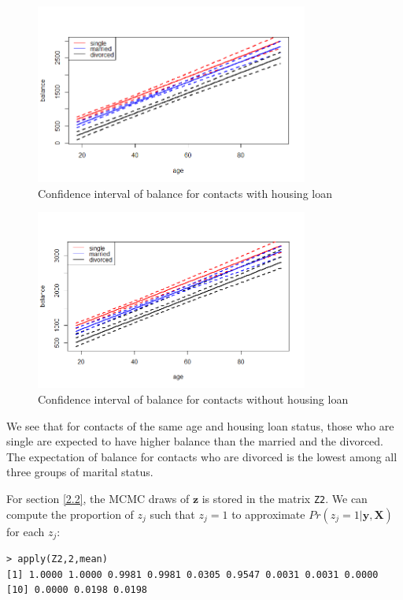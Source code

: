 \documentclass[a4page]{article}
\begin{document}
    \begin{figure}[H]
        \centering
        \includegraphics[width=0.8\textwidth]{intervals_h.png}
        \caption{Confidence interval of balance for contacts with housing loan\label{fig:intervals_h}}
    \end{figure}
     \begin{figure}[H]
    \centering
        \includegraphics[width=0.8\textwidth]{intervals.png}
        \caption{Confidence interval of balance for contacts without housing loan\label{fig:intervals}}
    \end{figure}
    We see that for contacts of the same age and housing loan status, those who are single are expected to have higher balance than the married and the divorced. The expectation of balance for contacts who are divorced is the lowest among all three groups of marital status.\par
    For section \ref{2.2}, the MCMC draws of $\bm{z}$ is stored in the matrix \verb|Z2|. We can compute the proportion of $z_j$ such that $z_j = 1$ to approximate $Pr(z_j=1|\bm{y},\bm{X})$ for each $z_j$:
    \begin{verbatim}
> apply(Z2,2,mean)
[1] 1.0000 1.0000 0.9981 0.9981 0.0305 0.9547 0.0031 0.0031 0.0000
[10] 0.0000 0.0198 0.0198
    \end{verbatim}
\end{document}
